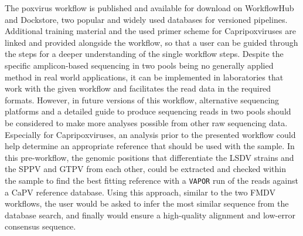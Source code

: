 The poxvirus workflow is published and available for download on WorkflowHub and Dockstore, two popular and widely used databases for versioned pipelines. Additional training material and the used primer scheme for Capripoxviruses are linked and provided alongside the workflow, so that a user can be guided through the steps for a deeper understanding of the single workflow steps. Despite the specific amplicon-based sequencing in two pools being no generally applied method in real world applications, it can be implemented in laboratories that work with the given workflow and facilitates the read data in the required formats. However, in future versions of this workflow, alternative sequencing platforms and a detailed guide to produce sequencing reads in two pools should be considered to make more analyses possible from other raw sequencing data. Especially for Capripoxviruses, an analysis prior to the presented workflow could help determine an appropriate reference that should be used with the sample. In this pre-workflow, the genomic positions that differentiate the \ac{LSDV} strains and the \ac{SPPV} and \ac{GTPV} from each other, could be extracted and checked within the sample to find the best fitting reference with a \texttt{VAPOR} run of the reads against a \ac{CaPV} reference database. Using this approach, similar to the two \ac{FMDV} workflows, the user would be asked to infer the most similar sequence from the database search, and finally would ensure a high-quality alignment and low-error consensus sequence.

